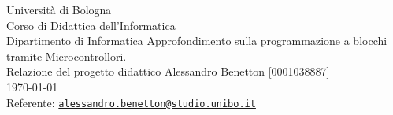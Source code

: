 \documentclass[../../relazione.tex]{subfiles}
\begin{document}
\begin{titlepage}
    \begin{center}
    {
        \LARGE{
            Università di Bologna \\ [1ex]
            Corso di Didattica dell'Informatica \\ Dipartimento di Informatica
        }
        \vfill
        {\huge
            Approfondimento sulla programmazione a blocchi tramite Microcontrollori.
        }
        \\ [1ex]
        {\large 
            Relazione del progetto didattico
        }
        \vfill
        {\large   
            Alessandro Benetton [0001038887]\\[0.75ex]
            
        \vfill
        \today
        \\[4ex]
        Referente: \href{mailto:alessandro.benetton@studio.unibo.it}{\tt alessandro.benetton@studio.unibo.it}
        }
    }
    \end{center}
\end{titlepage}
\end{document}
